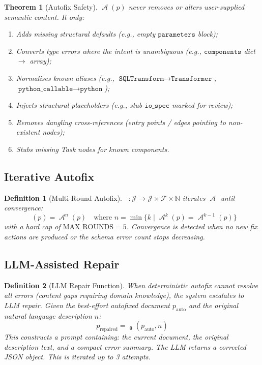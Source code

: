\documentclass[11pt,a4paper]{article}
\newtheorem{definition}{Definition}[section]
\newtheorem{theorem}{Theorem}[section]
\theoremstyle{definition}
\DeclareMathOperator{\Autofix}{\mathcal{A}}
\DeclareMathOperator{\AutofixMulti}{\mathcal{A}^*}
\DeclareMathOperator{\RepairLLM}{\mathcal{R}_{\bm\theta}}
\newcommand{\jspace}{\mathcal{J}}
\newcommand{\fixs}{\mathcal{F}}
\begin{document}
\begin{theorem}[Autofix Safety]
$\Autofix(p)$ never removes or alters user-supplied semantic content. It only:
\begin{enumerate}[label=(\alph*),leftmargin=*]
    \item Adds missing structural defaults (e.g., empty $\texttt{parameters}$ block);
    \item Converts type errors where the intent is unambiguous (e.g., $\texttt{components}$ dict $\to$ array);
    \item Normalises known aliases (e.g., $\texttt{SQLTransform} \to \texttt{Transformer}$, $\texttt{python\_callable} \to \texttt{python}$);
    \item Injects structural placeholders (e.g., stub $\texttt{io\_spec}$ marked for review);
    \item Removes dangling cross-references (entry points / edges pointing to non-existent nodes);
    \item Stubs missing Task nodes for known components.
\end{enumerate}
\end{theorem}

\subsection{Iterative Autofix}
\begin{definition}[Multi-Round Autofix]
$\AutofixMulti : \jspace \to \jspace \times \fixs \times \mathbb{N}$ iterates $\Autofix$ until convergence:
\begin{equation}
\AutofixMulti(p) = \Autofix^n(p) \quad \text{where } n = \min\{k \mid \Autofix^{k}(p) = \Autofix^{k-1}(p)\}
\end{equation}
with a hard cap of $\text{MAX\_ROUNDS} = 5$. Convergence is detected when no new fix actions are produced or the schema error count stops decreasing.
\end{definition}

\subsection{LLM-Assisted Repair}
\begin{definition}[LLM Repair Function]
When deterministic autofix cannot resolve all errors (content gaps requiring domain knowledge), the system escalates to LLM repair. Given the best-effort autofixed document $p_{\text{auto}}$ and the original natural language description $n$:
\begin{equation}
p_{\text{repaired}} = \RepairLLM_{\bm\theta}(p_{\text{auto}}, n)
\end{equation}
This constructs a prompt containing: the current document, the original description text, and a compact error summary. The LLM returns a corrected JSON object. This is iterated up to 3 attempts.
\end{definition}
\end{document}
